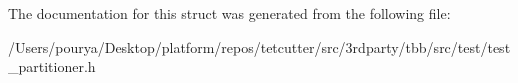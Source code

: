 The documentation for this struct was generated from the following file\+:\begin{DoxyCompactItemize}
\item 
/\+Users/pourya/\+Desktop/platform/repos/tetcutter/src/3rdparty/tbb/src/test/test\+\_\+partitioner.\+h\end{DoxyCompactItemize}
